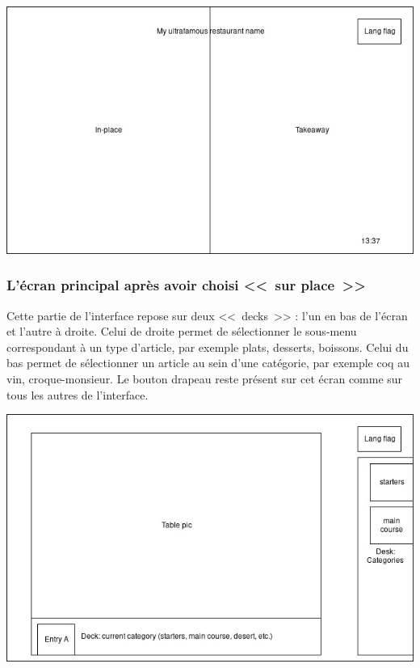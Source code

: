 \documentclass[a4paper,12pt]{article}
\begin{document}
\begin{center}
	\includegraphics[width=\textwidth]{alt_intro_screen.jpg}
\end{center}

\subsubsection{L'écran principal après avoir choisi <<~sur place~>>}

Cette partie de l'interface repose sur deux <<~decks~>> : l'un en bas de l'écran et l'autre à droite. Celui de droite
permet de sélectionner le sous-menu correspondant à un type d'article, par exemple plats, desserts, boissons. Celui
du bas permet de sélectionner un article au sein d'une catégorie, par exemple coq au vin, croque-monsieur. Le bouton
drapeau reste présent sur cet écran comme sur tous les autres de l'interface.

\begin{center}
	\includegraphics[width=\textwidth]{in_place_screen1.jpg}
\end{center}
\end{document}
